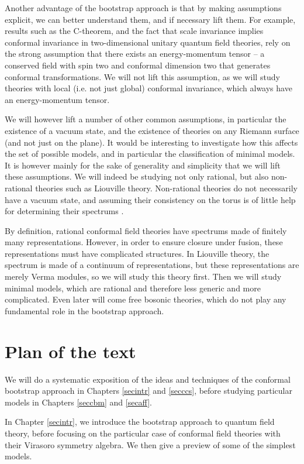 \documentclass[12pt, a4paper, notitlepage, twoside]{report}
\numberwithin{equation}{section}
\theoremstyle{break}
\begin{document}
Another advantage of the bootstrap approach is that by making assumptions explicit, we can better understand them, and if necessary lift them.
For example, results such as the C-theorem, and the fact that scale invariance implies conformal invariance in two-dimensional unitary quantum field theories, rely on the strong assumption that there exists an energy-momentum tensor -- a conserved field with spin two and conformal dimension two that generates conformal transformations.
We will not lift this assumption, as we will study theories with local (i.e.
not just global) conformal invariance, which always have an energy-momentum tensor.

We will however lift a number of other common assumptions, in particular the existence of a vacuum state, and the existence of theories on any Riemann surface (and not just on the plane).
It would be interesting to investigate how this affects the set of possible models, and in particular the classification of minimal models.
It is however mainly for the sake of generality and simplicity that
we will lift these assumptions.
We will indeed be studying not only rational, but also non-rational theories such as Liouville theory.
Non-rational theories do not necessarily have a vacuum state, and assuming their consistency on the torus is of little help for determining their spectrums \cite{rib14c}. 

By definition, rational conformal field theories have spectrums made of finitely many representations.
However, in order to ensure closure under fusion, these representations must have complicated structures.
In Liouville theory, the spectrum is made of a continuum of representations, but these representations are merely Verma modules, so we will study this theory first.
Then we will study minimal models, which are rational and therefore less generic and more complicated.
Even later will come free bosonic theories, which do not play any fundamental role in the bootstrap approach.


\section{Plan of the text \label{secplan}}

We will do a systematic exposition of the ideas and techniques of the conformal bootstrap approach in Chapters \ref{secintr} and \ref{secccs}, before studying particular models in Chapters \ref{seccbm} and \ref{secaff}.

In Chapter \ref{secintr}, we introduce the bootstrap approach to quantum field theory, before focusing on the particular case of conformal field theories with their Virasoro symmetry algebra.
We then give a preview of some of the simplest models.
\end{document}
